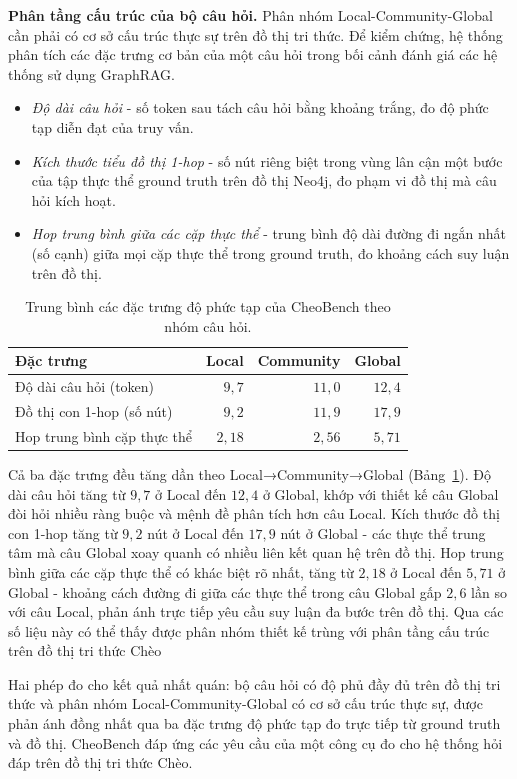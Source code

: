 \textbf{Phân tầng cấu trúc của bộ câu hỏi.}
Phân nhóm Local-Community-Global cần phải có cơ sở cấu trúc thực sự trên đồ thị tri thức. Để kiểm chứng, hệ thống phân tích các đặc trưng cơ bản của một câu hỏi trong bối cảnh đánh giá các hệ thống sử dụng GraphRAG.

\begin{itemize}
\item \textit{Độ dài câu hỏi} - số token sau tách câu hỏi bằng khoảng trắng, đo độ phức tạp diễn đạt của truy vấn. 
\item \textit{Kích thước tiểu đồ thị 1-hop} - số nút riêng biệt trong vùng lân cận một bước của tập thực thể ground truth trên đồ thị Neo4j, đo phạm vi đồ thị mà câu hỏi kích hoạt.
\item \textit{Hop trung bình giữa các cặp thực thể} - trung bình độ dài đường đi ngắn nhất (số cạnh) giữa mọi cặp thực thể trong ground truth, đo khoảng cách suy luận trên đồ thị.
\end{itemize}

\begin{table}[h]
\centering
\caption{Trung bình các đặc trưng độ phức tạp của CheoBench theo nhóm câu hỏi.}
\label{tab:benchmark_intrinsic}
\renewcommand{\arraystretch}{1.25}
\begin{tabular*}{\textwidth}{@{\extracolsep{\fill}}lrrr}
\hline
\textbf{Đặc trưng} & \textbf{Local} & \textbf{Community} & \textbf{Global} \\
\hline
Độ dài câu hỏi (token)         & $9,7$  & $11,0$ & $12,4$ \\
Đồ thị con 1-hop (số nút)     & $9,2$  & $11,9$ & $17,9$ \\
Hop trung bình cặp thực thể    & $2,18$ & $2,56$ & $5,71$ \\
\hline
\end{tabular*}
\end{table}

Cả ba đặc trưng đều tăng dần theo Local→Community→Global (Bảng~\ref{tab:benchmark_intrinsic}). Độ dài câu hỏi tăng từ $9,7$ ở Local đến $12,4$ ở Global, khớp với thiết kế câu Global đòi hỏi nhiều ràng buộc và mệnh đề phân tích hơn câu Local. Kích thước đồ thị con 1-hop tăng từ $9,2$ nút ở Local đến $17,9$ nút ở Global - các thực thể trung tâm mà câu Global xoay quanh có nhiều liên kết quan hệ trên đồ thị. Hop trung bình giữa các cặp thực thể có khác biệt rõ nhất, tăng từ $2,18$ ở Local đến $5,71$ ở Global - khoảng cách đường đi giữa các thực thể trong câu Global gấp $2,6$ lần so với câu Local, phản ánh trực tiếp yêu cầu suy luận đa bước trên đồ thị. Qua các số liệu này có thể thấy được phân nhóm thiết kế trùng với phân tầng cấu trúc trên đồ thị tri thức Chèo

Hai phép đo cho kết quả nhất quán: bộ câu hỏi có độ phủ đầy đủ trên đồ thị tri thức và phân nhóm Local-Community-Global có cơ sở cấu trúc thực sự, được phản ánh đồng nhất qua ba đặc trưng độ phức tạp đo trực tiếp từ ground truth và đồ thị. CheoBench đáp ứng các yêu cầu của một công cụ đo cho hệ thống hỏi đáp trên đồ thị tri thức Chèo.
